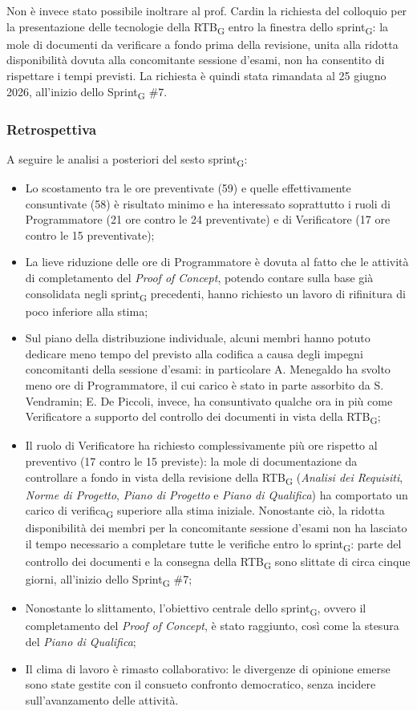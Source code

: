 \documentclass[a4paper, 10pt, colorlinks=true, linkcolor=black, urlcolor=blue, citecolor=blue, hidelinks]{article}
\begin{document}
Non è invece stato possibile inoltrare al prof. Cardin la richiesta del colloquio per la presentazione delle tecnologie della RTB\textsubscript{G} entro la finestra dello sprint\textsubscript{G}: la mole di documenti da verificare a fondo prima della revisione, unita alla ridotta disponibilità dovuta alla concomitante sessione d'esami, non ha consentito di rispettare i tempi previsti. La richiesta è quindi stata rimandata al 25 giugno 2026, all'inizio dello Sprint\textsubscript{G} \#7.

\subsubsection{Retrospettiva}
A seguire le analisi a posteriori del sesto sprint\textsubscript{G}:
\begin{itemize}
    \item Lo scostamento tra le ore preventivate (59) e quelle effettivamente consuntivate (58) è risultato minimo e ha interessato soprattutto i ruoli di Programmatore (21 ore contro le 24 preventivate) e di Verificatore (17 ore contro le 15 preventivate);
    \item La lieve riduzione delle ore di Programmatore è dovuta al fatto che le attività di completamento del \textit{Proof of Concept}, potendo contare sulla base già consolidata negli sprint\textsubscript{G} precedenti, hanno richiesto un lavoro di rifinitura di poco inferiore alla stima;
    \item Sul piano della distribuzione individuale, alcuni membri hanno potuto dedicare meno tempo del previsto alla codifica a causa degli impegni concomitanti della sessione d'esami: in particolare A. Menegaldo ha svolto meno ore di Programmatore, il cui carico è stato in parte assorbito da S. Vendramin; E. De Piccoli, invece, ha consuntivato qualche ora in più come Verificatore a supporto del controllo dei documenti in vista della RTB\textsubscript{G};
    \item Il ruolo di Verificatore ha richiesto complessivamente più ore rispetto al preventivo (17 contro le 15 previste): la mole di documentazione da controllare a fondo in vista della revisione della RTB\textsubscript{G} (\textit{Analisi dei Requisiti}, \textit{Norme di Progetto}, \textit{Piano di Progetto} e \textit{Piano di Qualifica}) ha comportato un carico di verifica\textsubscript{G} superiore alla stima iniziale. Nonostante ciò, la ridotta disponibilità dei membri per la concomitante sessione d'esami non ha lasciato il tempo necessario a completare tutte le verifiche entro lo sprint\textsubscript{G}: parte del controllo dei documenti e la consegna della RTB\textsubscript{G} sono slittate di circa cinque giorni, all'inizio dello Sprint\textsubscript{G} \#7;
    \item Nonostante lo slittamento, l'obiettivo centrale dello sprint\textsubscript{G}, ovvero il completamento del \textit{Proof of Concept}, è stato raggiunto, così come la stesura del \textit{Piano di Qualifica};
    \item Il clima di lavoro è rimasto collaborativo: le divergenze di opinione emerse sono state gestite con il consueto confronto democratico, senza incidere sull'avanzamento delle attività.
\end{itemize}
\end{document}
